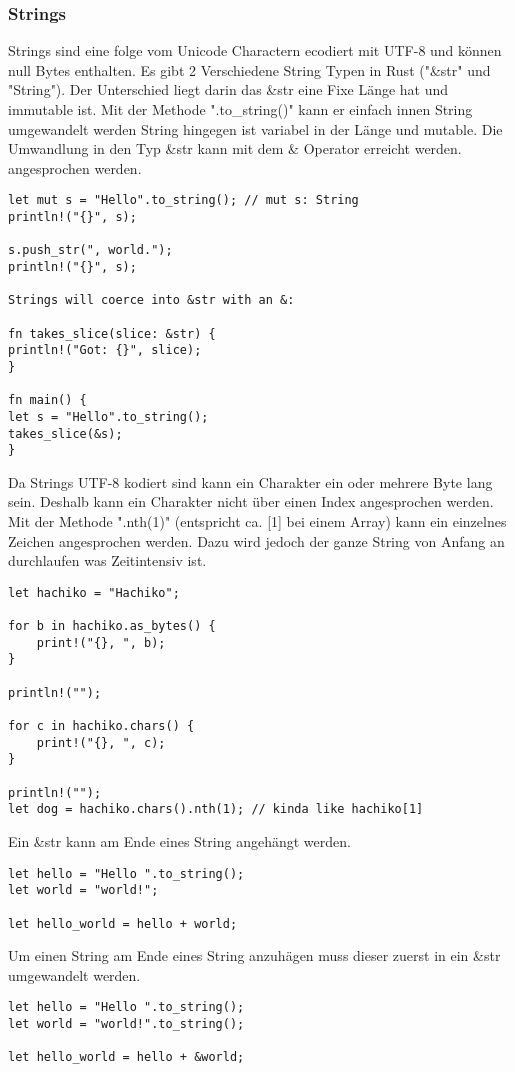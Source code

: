 \subsubsection{Strings}
Strings sind eine folge vom Unicode Charactern ecodiert mit UTF-8 und können null Bytes enthalten. Es gibt 2 Verschiedene String Typen in Rust ("\&str" und "String"). Der Unterschied liegt darin das \&str eine Fixe Länge hat und immutable ist. Mit der Methode ".to\_string()" kann er einfach innen String umgewandelt werden String hingegen ist variabel in der Länge und mutable. Die Umwandlung in den Typ \&str kann mit dem \& Operator erreicht werden.  angesprochen werden.

\begin{lstlisting}
let mut s = "Hello".to_string(); // mut s: String
println!("{}", s);

s.push_str(", world.");
println!("{}", s);

Strings will coerce into &str with an &:

fn takes_slice(slice: &str) {
println!("Got: {}", slice);
}

fn main() {
let s = "Hello".to_string();
takes_slice(&s);
}
\end{lstlisting}


Da Strings UTF-8 kodiert sind kann ein Charakter ein oder mehrere Byte lang sein. Deshalb kann ein Charakter nicht über einen Index angesprochen werden. Mit der Methode ".nth(1)" (entspricht ca. [1] bei einem Array) kann ein einzelnes Zeichen angesprochen werden. Dazu wird jedoch der ganze String von Anfang an durchlaufen was Zeitintensiv ist.

\begin{lstlisting}
let hachiko = "Hachiko";

for b in hachiko.as_bytes() {
	print!("{}, ", b);
}

println!("");

for c in hachiko.chars() {
	print!("{}, ", c);
}

println!("");
let dog = hachiko.chars().nth(1); // kinda like hachiko[1]
\end{lstlisting}


Ein \&str kann am Ende eines String angehängt werden.

\begin{lstlisting}
let hello = "Hello ".to_string();
let world = "world!";

let hello_world = hello + world;
\end{lstlisting}

Um einen String am Ende eines String anzuhägen muss dieser zuerst in ein \&str umgewandelt werden.

\begin{lstlisting}
let hello = "Hello ".to_string();
let world = "world!".to_string();

let hello_world = hello + &world;
\end{lstlisting}